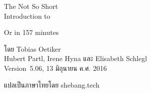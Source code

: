 The Not So Short\\ 
Introduction to \LaTeXe

Or \LaTeXe{} in 157 minutes

โดย Tobias Oetiker\\
Hubert Partl, Irene Hyna และ Elisabeth Schlegl\\
Version~5.06, 13 มิถุนายน ค.ศ. 2016

แปลเป็นภาษาไทยโดย shebang.tech
